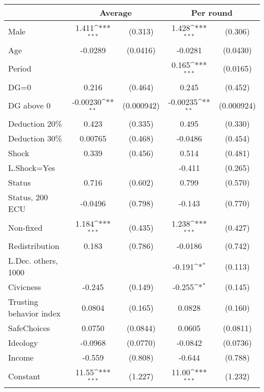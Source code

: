 {
\def\sym#1{\ifmmode^{#1}\else\(^{#1}\)\fi}
\begin{tabular}{l*{2}{cc}}
\hline\hline
                &\multicolumn{2}{c}{Average} &\multicolumn{2}{c}{Per round}\\
\hline
Male            &    1.411\sym{***}&  (0.313)&    1.428\sym{***}&  (0.306)\\
Age             &  -0.0289         & (0.0416)&  -0.0281         & (0.0430)\\
Period          &                  &         &    0.165\sym{***}& (0.0165)\\
DG=0            &    0.216         &  (0.464)&    0.245         &  (0.452)\\
DG above 0      & -0.00230\sym{**} &(0.000942)& -0.00235\sym{**} &(0.000924)\\
Deduction 20\%  &    0.423         &  (0.335)&    0.495         &  (0.330)\\
Deduction 30\%  &  0.00765         &  (0.468)&  -0.0486         &  (0.454)\\
Shock           &    0.339         &  (0.456)&    0.514         &  (0.481)\\
L.Shock=Yes     &                  &         &   -0.411         &  (0.265)\\
Status          &    0.716         &  (0.602)&    0.799         &  (0.570)\\
Status, 200 ECU &  -0.0496         &  (0.798)&   -0.143         &  (0.770)\\
Non-fixed       &    1.184\sym{***}&  (0.435)&    1.238\sym{***}&  (0.427)\\
Redistribution  &    0.183         &  (0.786)&  -0.0186         &  (0.742)\\
L.Dec. others, 1000&                  &         &   -0.191\sym{*}  &  (0.113)\\
Civicness       &   -0.245         &  (0.149)&   -0.255\sym{*}  &  (0.145)\\
Trusting behavior index&   0.0804         &  (0.165)&   0.0828         &  (0.160)\\
SafeChoices     &   0.0750         & (0.0844)&   0.0605         & (0.0811)\\
Ideology        &  -0.0968         & (0.0770)&  -0.0842         & (0.0736)\\
Income          &   -0.559         &  (0.808)&   -0.644         &  (0.788)\\
Constant        &    11.55\sym{***}&  (1.227)&    11.00\sym{***}&  (1.232)\\

\end{tabular}}
